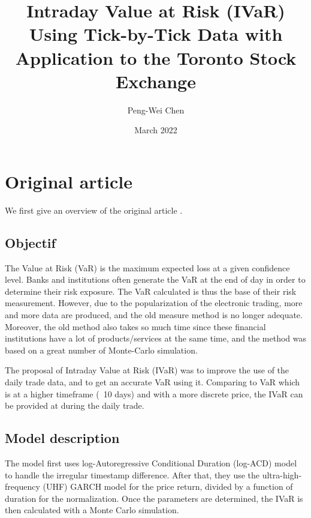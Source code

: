 \documentclass[12pt, a4paper]{article}
\title{Intraday Value at Risk (IVaR) Using Tick-by-Tick Data with Application to the Toronto Stock Exchange}
\author{Peng-Wei Chen}
\date{March 2022}
\begin{document}
\maketitle

\section{Original article}
We first give an overview of the original article \cite{Toronto}.
\subsection{Objectif}
\par
The Value at Risk (VaR) is the maximum expected loss at a given confidence level.
Banks and institutions often generate the VaR at the end of  day in order to determine their risk exposure.
The VaR calculated is thus the base of their risk measurement.
However, due to the popularization of the electronic trading, more and more data are produced,
and the old measure method is no longer adequate.
Moreover, the old method also takes so much time since these financial institutions have a lot of products/services at the same time,
and the method was based on a great number of Monte-Carlo simulation.
\par
The proposal of Intraday Value at Risk (IVaR) was to improve the use of  the daily trade data, 
and to get an accurate VaR using it.
Comparing to VaR which is at a higher timeframe (~10 days) and with a more discrete price, 
the IVaR can be provided at during the daily trade.

\subsection{Model description}
The model first uses log-Autoregressive Conditional Duration (log-ACD) model to handle the irregular timestamp difference.
After that, they use the ultra-high-frequency (UHF) GARCH model for the price return,
divided by a function of duration for the normalization.
Once the parameters are determined, 
the IVaR is then calculated with a Monte Carlo simulation.
\end{document}
